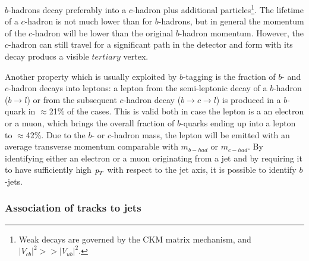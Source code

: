 $b$-hadrons decay preferably into a $c$-hadron plus additional particles\footnote{Weak decays are governed by the CKM matrix mechanism, and $|V_{cb}|^2 >> |V_{ub}|^2$.}. The lifetime of a $c$-hadron is not much lower than for $b$-hadrons, but in general the momentum of the $c$-hadron will be lower than the original $b$-hadron momentum. However, the $c$-hadron can still travel for a significant path in the detector and form with its decay producs a visible $tertiary$ vertex. 

Another property which is usually exploited by $b$-tagging is the fraction of $b$- and $c$-hadron decays into leptons: a lepton from the semi-leptonic decay of a $b$-hadron ($b \rightarrow l$) or from the subsequent $c$-hadron decay ($b \rightarrow c \rightarrow l$) is produced in a $b$-quark in $\approx$21\% of the cases. This is valid both in case the lepton is a an electron or a muon, which brings the overall fraction of $b$-quarks ending up into a lepton to $\approx$42\%. Due to the $b$- or $c$-hadron mass, the lepton will be emitted with an average transverse momentum comparable with $m_{b-had}$ or $m_{c-had}$. By identifying either an electron or a muon originating from a jet and by requiring it to have sufficiently high ${\emph{p}_{T}}$ with respect to the jet axis, it is possible to identify $b$-jets.



\subsubsection{Association of tracks to jets}

